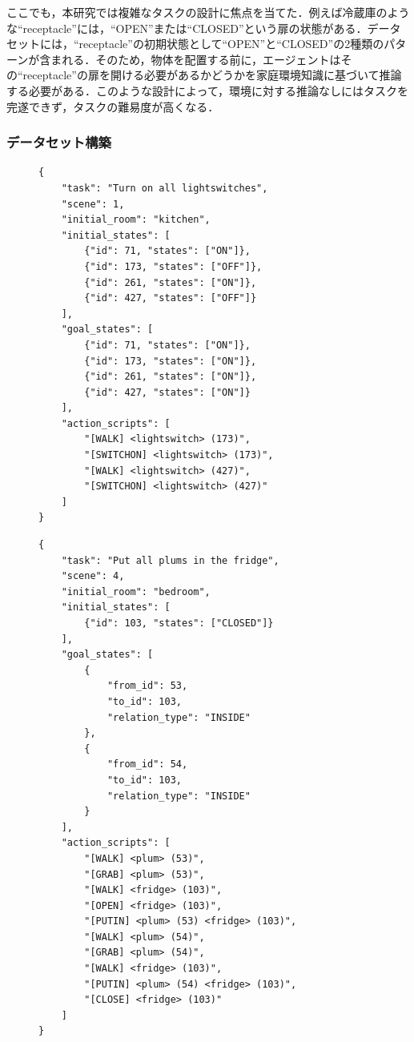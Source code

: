 ここでも，本研究では複雑なタスクの設計に焦点を当てた．例えば冷蔵庫のような``receptacle''には，``OPEN''または``CLOSED''という扉の状態がある．データセットには，``receptacle''の初期状態として``OPEN''と``CLOSED''の2種類のパターンが含まれる．そのため，物体を配置する前に，エージェントはその``receptacle''の扉を開ける必要があるかどうかを家庭環境知識に基づいて推論する必要がある．このような設計によって，環境に対する推論なしにはタスクを完遂できず，タスクの難易度が高くなる．

\subsubsection{データセット構築}
\begin{figure}[tb]
    \begin{lstlisting}[caption=状態変化タスクのデータセット例, label=state-change-task]
{
    "task": "Turn on all lightswitches",
    "scene": 1,
    "initial_room": "kitchen",
    "initial_states": [
        {"id": 71, "states": ["ON"]},
        {"id": 173, "states": ["OFF"]},
        {"id": 261, "states": ["ON"]},
        {"id": 427, "states": ["OFF"]}
    ],
    "goal_states": [
        {"id": 71, "states": ["ON"]},
        {"id": 173, "states": ["ON"]},
        {"id": 261, "states": ["ON"]},
        {"id": 427, "states": ["ON"]}
    ],
    "action_scripts": [
        "[WALK] <lightswitch> (173)",
        "[SWITCHON] <lightswitch> (173)",
        "[WALK] <lightswitch> (427)",
        "[SWITCHON] <lightswitch> (427)"
    ]
}
    \end{lstlisting}
\end{figure}

\begin{figure}[tb]
    \begin{lstlisting}[caption=配置タスクのデータセット例, label=placement-task]
{
    "task": "Put all plums in the fridge",
    "scene": 4,
    "initial_room": "bedroom",
    "initial_states": [
        {"id": 103, "states": ["CLOSED"]}
    ],
    "goal_states": [
        {
            "from_id": 53,
            "to_id": 103,
            "relation_type": "INSIDE"
        },
        {
            "from_id": 54,
            "to_id": 103,
            "relation_type": "INSIDE"
        }
    ],
    "action_scripts": [
        "[WALK] <plum> (53)",
        "[GRAB] <plum> (53)",
        "[WALK] <fridge> (103)",
        "[OPEN] <fridge> (103)",
        "[PUTIN] <plum> (53) <fridge> (103)",
        "[WALK] <plum> (54)",
        "[GRAB] <plum> (54)",
        "[WALK] <fridge> (103)",
        "[PUTIN] <plum> (54) <fridge> (103)",
        "[CLOSE] <fridge> (103)"
    ]
}
    \end{lstlisting}
\end{figure}

